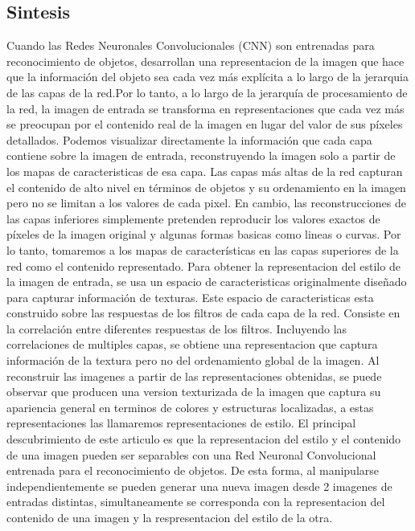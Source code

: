 \documentclass[a4paper,12pt,spanish]{book}
\begin{document}
    \subsection{Sintesis}
      Cuando las Redes Neuronales Convolucionales (CNN) son entrenadas para reconocimiento de objetos, desarrollan una representacion de la imagen que hace que la información 
      del objeto sea cada vez más explícita a lo largo de la jerarquia de las capas de la red.Por lo tanto, a lo largo de la jerarquía de procesamiento de la red, 
      la imagen de entrada se transforma en representaciones que cada vez más se preocupan por el contenido real de la imagen en lugar del valor de sus píxeles detallados. 
      Podemos visualizar directamente la información que cada capa contiene sobre la imagen de entrada, reconstruyendo la imagen solo a partir de los mapas de caracteristicas
      de esa capa. Las capas más altas de la red capturan el contenido de alto nivel en términos de objetos y su ordenamiento en la imagen pero no se limitan a los valores de cada 
      pixel. En  cambio, las reconstrucciones de las capas inferiores simplemente pretenden reproducir los valores exactos de píxeles de la imagen original y algunas formas
      basicas como lineas o curvas. Por lo tanto, tomaremos a los mapas de características en las capas superiores de la red como el contenido representado.
      Para obtener la representacion del estilo de la imagen de entrada, se usa un espacio de caracteristicas originalmente diseñado para capturar información de texturas.
      Este espacio de caracteristicas esta construido sobre las respuestas de los filtros de cada capa de la red. Consiste en la correlación entre diferentes respuestas de los filtros.
      Incluyendo las correlaciones de multiples capas, se obtiene una representacion que captura información de la textura pero no del ordenamiento global de la imagen.
      Al reconstruir las imagenes a partir de las representaciones obtenidas, se puede observar que producen una version texturizada de la imagen que captura su 
      apariencia general en terminos de colores y estructuras localizadas, a estas representaciones las llamaremos representaciones de estilo.
      El principal descubrimiento de este articulo es que la representacion del estilo y el contenido de una imagen pueden ser separables con una Red Neuronal Convolucional entrenada 
      para el reconocimiento de objetos. De esta forma, al manipularse independientemente se pueden generar una nueva imagen desde 2 imagenes de entradas distintas, simultaneamente se corresponda con la representacion
      del contenido de una imagen y la respresentacion del estilo de la otra.
\end{document}
